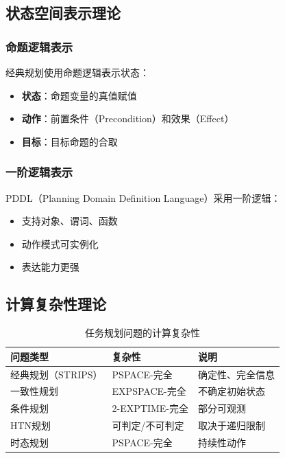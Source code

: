 \documentclass[12pt,a4paper]{ctexart}
\begin{document}
\subsection{状态空间表示理论}

\subsubsection{命题逻辑表示}

经典规划使用命题逻辑表示状态：
\begin{itemize}[leftmargin=2em]
    \item \textbf{状态}：命题变量的真值赋值
    \item \textbf{动作}：前置条件（Precondition）和效果（Effect）
    \item \textbf{目标}：目标命题的合取
\end{itemize}

\subsubsection{一阶逻辑表示}

PDDL（Planning Domain Definition Language）采用一阶逻辑：
\begin{itemize}[leftmargin=2em]
    \item 支持对象、谓词、函数
    \item 动作模式可实例化
    \item 表达能力更强
\end{itemize}

\subsection{计算复杂性理论}

\begin{table}[htbp]
\centering
\caption{任务规划问题的计算复杂性}
\begin{tabular}{p{4cm}p{3cm}p{4cm}}
\toprule
\textbf{问题类型} & \textbf{复杂性} & \textbf{说明} \\
\midrule
经典规划（STRIPS） & PSPACE-完全 & 确定性、完全信息 \\
一致性规划 & EXPSPACE-完全 & 不确定初始状态 \\
条件规划 & 2-EXPTIME-完全 & 部分可观测 \\
HTN规划 & 可判定/不可判定 & 取决于递归限制 \\
时态规划 & PSPACE-完全 & 持续性动作 \\
\bottomrule
\end{tabular}
\end{table}
\end{document}
